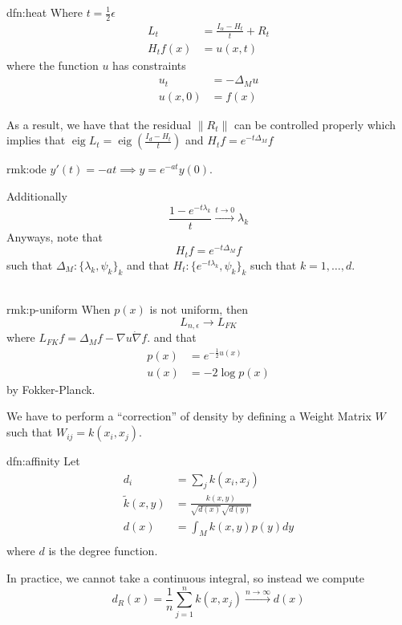 \documentclass[12pt]{article}
\DeclareMathOperator*{\eig}{eig}
\begin{document}
\begin{dfn}{dfn:heat}
Where $ t = \frac{1}{2} \epsilon $
\begin{align*}
	L_t &= \frac{I_{\alpha} - H_t}{t} + R_t \\
	H_t f(x) &= u(x, t)
\end{align*}
where the function $ u $ has constraints
\begin{align*}
 u_{t} &= -\Delta_M u \\
	u(x, 0) &= f(x)
\end{align*}
\end{dfn}
As a result, we have that the residual $ \| R_t \| $ can be controlled properly
which implies that $ \eig{L_t} = \eig{( \frac{I_d - H_t}{t} )} $
and $ H_t f = e^{-t \Delta_M} f $
\begin{rmk}{rmk:ode}
$ y'(t) = -at \implies y = e^{-at} y(0) $.
\end{rmk}
Additionally
\[
\frac{1 - e^{-t\lambda_k}}{t} \xrightarrow{t \to 0} \lambda_k
\]
Anyways, note that
\[
H_t f = e^{-t \Delta_M} f
\]
such that $ \Delta_M : \{ \lambda_k, \psi_k \}_k $
and that $ H_t : \{ e^{-t \lambda_k}, \psi_k \}_k $
such that $ k = 1, \ldots, d $.
\\ \\
\begin{rmk}[$ p(x) $ Uniformity]{rmk:p-uniform}
	When $ p(x) $ is not uniform, then
	\[
	L_{n, \epsilon} \to L_{FK}
	\]
	where $ L_{FK} f = \Delta_M f - \nabla u \dot \nabla f $.
	and that
	\begin{align*}
		p(x) &= e^{-\frac{1}{2} u(x)} \\
		u(x) &= -2 \log{p(x)}
	\end{align*}
	by Fokker-Planck.
\end{rmk}
We have to perform a ``correction'' of density by defining a Weight Matrix $ W $ such that $ W_{ij} = k(x_i, x_j) $.
\begin{dfn}{dfn:affinity}
	Let
	\begin{align*}
		d_i &= \sum_{j} k(x_i, x_j) \\
		\widetilde{k} (x, y) &= \frac{k(x, y)}{\sqrt{d(x)} \sqrt{d(y)}} \\
		d(x) &= \int_M k(x, y) p(y) dy \\
	\end{align*}
	where $ d $ is the degree function.
\end{dfn}
In practice, we cannot take a continuous integral, so instead we compute
\[
d_R (x) = \frac{1}{n} \sum_{j = 1}^n k(x, x_j) \xrightarrow{n \to \infty} d(x)
\]
\end{document}
